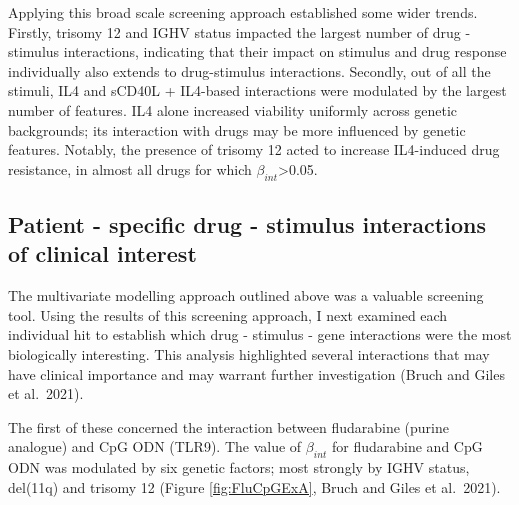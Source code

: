\documentclass[11pt, a4paper, twosided]{book}
\begin{document}
Applying this broad scale screening approach established some wider trends. Firstly, trisomy 12 and IGHV status impacted the largest number of drug - stimulus interactions, indicating that their impact on stimulus and drug response individually also extends to drug-stimulus interactions. Secondly, out of all the stimuli, IL4 and sCD40L + IL4-based interactions were modulated by the largest number of features. IL4 alone increased viability uniformly across genetic backgrounds; its interaction with drugs may be more influenced by genetic features. Notably, the presence of trisomy 12 acted to increase IL4-induced drug resistance, in almost all drugs for which \(\beta_{int}\)\textgreater0.05.

\hypertarget{drug-stimulus-gene-predictor-profile}{%
\subsection{Patient - specific drug - stimulus interactions of clinical interest}\label{drug-stimulus-gene-predictor-profile}}

The multivariate modelling approach outlined above was a valuable screening tool. Using the results of this screening approach, I next examined each individual hit to establish which drug - stimulus - gene interactions were the most biologically interesting. This analysis highlighted several interactions that may have clinical importance and may warrant further investigation (Bruch and Giles et al.~2021).

The first of these concerned the interaction between fludarabine (purine analogue) and CpG ODN (TLR9). The value of \(\beta_{int}\) for fludarabine and CpG ODN was modulated by six genetic factors; most strongly by IGHV status, del(11q) and trisomy 12 (Figure \ref{fig:FluCpGExA}, Bruch and Giles et al.~2021).
\end{document}
